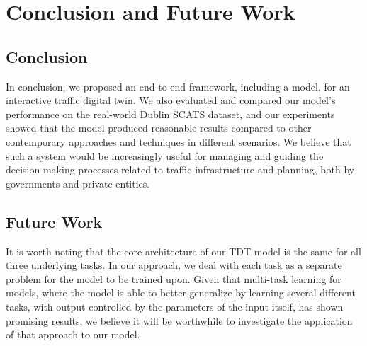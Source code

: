 \chapter{Conclusion and Future Work}
\section{Conclusion}
In conclusion, we proposed an end-to-end framework, including a model, for an interactive traffic digital twin. We also evaluated and compared our model's performance on the real-world Dublin SCATS dataset, and our experiments showed that the model produced reasonable results compared to other contemporary approaches and techniques in different scenarios. We believe that such a system would be increasingly useful for managing and guiding the decision-making processes related to traffic infrastructure and planning, both by governments and private entities.

\section{Future Work}

It is worth noting that the core architecture of our TDT model is the same for all three underlying tasks. In our approach, we deal with each task as a separate problem for the model to be trained upon. Given that multi-task learning for models, where the model is able to better generalize by learning several different tasks, with output controlled by the parameters of the input itself, has shown promising results, we believe it will be worthwhile to investigate the application of that approach to our model.
